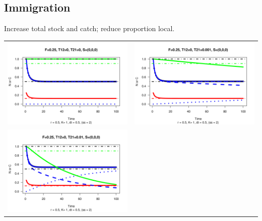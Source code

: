 \documentclass[a4paper,KOMA,landscape,titlepage]{powersem}
\begin{document}
\begin{slide}\section{Immigration}
\begin{center}
Increase total stock and catch; reduce proportion local.
\begin{tabular}{cc}
\includegraphics[height=0.35\textheight]{./graphics/r05F025T120T210S000.png}&
\includegraphics[height=0.35\textheight]{./graphics/r05F025T120T210001S000.png}\\
\includegraphics[height=0.35\textheight]{./graphics/r05F025T120T21001S000.png}&

\end{tabular}
\end{center}
\end{slide}
\end{document}
